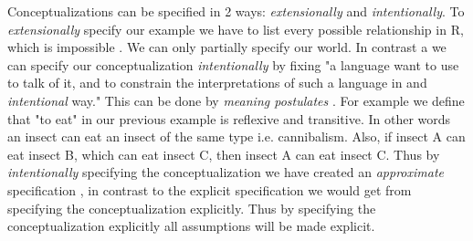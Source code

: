 \documentclass[12pt,a4paper]{article}
\begin{document}
Conceptualizations can be specified in 2 ways: \emph{extensionally} and \emph{intentionally}\citep[p.8]{GuObSt09}. To \emph{extensionally} specify our example we have to list every possible relationship in R, which is impossible \cite{GuObSt09}. We can only partially specify our world. 
In contrast a we can specify our conceptualization \emph{intentionally} by fixing "a language want to use to talk of it, and to constrain the interpretations of such a language in and \emph{intentional} way." \citep[p.8]{GuObSt09} This can be done by \emph{meaning postulates} \cite{Nagel1948}. For example we define that "to eat" in our previous example is reflexive and transitive. In other words an insect can eat an insect of the same type i.e. cannibalism. Also, if insect A can eat insect B, which can eat insect C, then insect A can eat insect C.
Thus by \emph{intentionally} specifying the conceptualization we have created an \emph{approximate} specification \cite{GuObSt09}, in contrast to the explicit specification we would get from specifying the conceptualization explicitly. 
Thus by specifying the conceptualization explicitly all assumptions will be made explicit.

\end{document}
